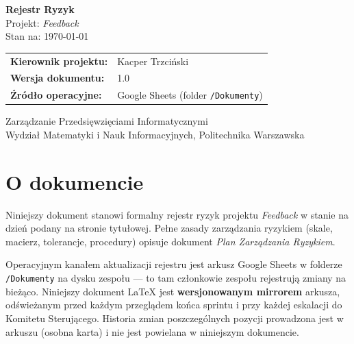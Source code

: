 \documentclass[11pt,a4paper]{article}
\newcommand{\docTitle}{Rejestr Ryzyk}
\begin{document}
	
	\begin{titlepage}
		\centering
		\vspace*{2cm}
		{\LARGE\bfseries\color{accent} \docTitle}\\[0.5cm]
		{\large Projekt: \textit{Feedback}}\\[0.3cm]
		{\normalsize Stan na: \today}\\[2cm]
		
		\begin{tabular}{ll}
			\textbf{Kierownik projektu:}   & Kacper Trzciński \\[0.3em]
			\textbf{Wersja dokumentu:}     & 1.0 \\[0.3em]
			\textbf{Źródło operacyjne:}    & Google Sheets (folder \texttt{/Dokumenty}) \\[0.3em]
		\end{tabular}
		
		\vfill
		{\small Zarządzanie Przedsięwzięciami Informatycznymi\\
			Wydział Matematyki i Nauk Informacyjnych, Politechnika Warszawska}
	\end{titlepage}
	
	
	\section*{O dokumencie}
	
	Niniejszy dokument stanowi formalny rejestr ryzyk projektu \textit{Feedback} w stanie
	na dzień podany na stronie tytułowej. Pełne zasady zarządzania ryzykiem (skale, macierz,
	tolerancje, procedury) opisuje dokument \textit{Plan Zarządzania Ryzykiem}.
	
	Operacyjnym kanałem aktualizacji rejestru jest arkusz Google Sheets w folderze
	\texttt{/Dokumenty} na dysku zespołu --- to tam członkowie zespołu rejestrują zmiany na
	bieżąco. Niniejszy dokument \LaTeX{} jest \textbf{wersjonowanym mirrorem} arkusza,
	odświeżanym przed każdym przeglądem końca sprintu i przy każdej eskalacji do Komitetu
	Sterującego. Historia zmian poszczególnych pozycji prowadzona jest w arkuszu (osobna
	karta) i nie jest powielana w niniejszym dokumencie.
	
\end{document}
